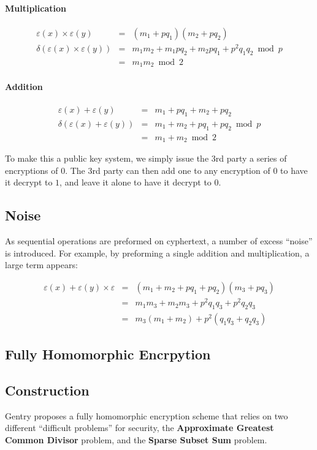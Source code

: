 \documentclass[a4paper,10pt]{article}
\begin{document}
\paragraph{Multiplication}
\begin{eqnarray*}
\varepsilon(x) \times \varepsilon(y) &=& (m_1 + p q_1)(m_2 + p q_2)\\
\delta(\varepsilon(x) \times \varepsilon(y))&=& m_1m_2 + m_1pq_2 + m_2pq_1 + p^2q_1q_2 \bmod p\\
&=& m_1m_2 \bmod 2
\end{eqnarray*}

\paragraph{Addition}
\begin{eqnarray*}
\varepsilon(x) + \varepsilon(y) &=& m_1 + p q_1 + m_2 + p q_2\\
\delta(\varepsilon(x) + \varepsilon(y))&=& m_1 + m_2 + pq_1 + pq_2 \bmod p\\
&=& m_1 + m_2 \bmod 2
\end{eqnarray*}

To make this a public key system, we simply issue the 3rd party a
series of encryptions of $0$. The 3rd party can then add one to any
encryption of $0$ to have it decrypt to $1$, and leave it alone to
have it decrypt to $0$.

\subsection{Noise}
As sequential operations are preformed on cyphertext, a number of
excess ``noise'' is introduced. For example, by preforming a single
addition and multiplication, a large term appears:

\begin{eqnarray*}
\varepsilon(x) + \varepsilon(y) \times \varepsilon &=& (m_1 + m_2 + pq_1 + pq_2)(m_3 + pq_3)\\
&=&m_1m_3 + m_2m_3 + p^2q_1q_3 + p^2q_2q_3\\
&=&m_3(m_1 + m_2) + p^2(q_1q_3 + q_2q_3)
\end{eqnarray*}

\subsection{Fully Homomorphic Encrpytion}

\subsection{Construction}
Gentry proposes a fully homomorphic encryption scheme that relies on
two different ``difficult problems'' for security, the
\textbf{Approximate Greatest Common Divisor} problem, and the
\textbf{Sparse Subset Sum} problem.
\end{document}
